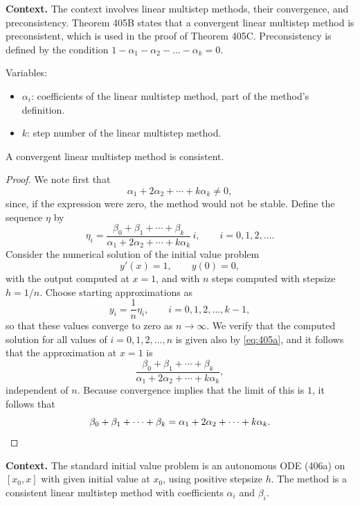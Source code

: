 \noindent\textbf{Context.}
The context involves linear multistep methods, their convergence, and preconsistency. Theorem 405B states that a convergent linear multistep method is preconsistent, which is used in the proof of Theorem 405C. Preconsistency is defined by the condition $1 - \alpha_1 - \alpha_2 - \dots - \alpha_k = 0$.

Variables:
\begin{itemize}
    \item $\alpha_i$: coefficients of the linear multistep method, part of the method's definition.
    \item $k$: step number of the linear multistep method.
\end{itemize}

\begin{theorem}

  \label{thm:405C}
A convergent linear multistep method is consistent.
\end{theorem}

\begin{proof}
We note first that
\[
\alpha_1 + 2\alpha_2 + \cdots + k\alpha_k \neq 0,
\]
since, if the expression were zero, the method would not be stable. Define the sequence $\eta$ by
\[
\eta_i = \frac{\beta_0 + \beta_1 + \cdots + \beta_k}{\alpha_1 + 2\alpha_2 + \cdots + k\alpha_k} \, i, \qquad i = 0, 1, 2, \dots .
\]
Consider the numerical solution of the initial value problem
\[
y'(x) = 1, \qquad y(0) = 0,
\]
with the output computed at $x = 1$, and with $n$ steps computed with stepsize $h = 1/n$. Choose starting approximations as
\[
y_i = \frac{1}{n} \eta_i, \qquad i = 0, 1, 2, \dots, k-1, \tag{405a}
\]
so that these values converge to zero as $n \to \infty$. We verify that the computed solution for all values of $i = 0, 1, 2, \dots, n$ is given also by \eqref{eq:405a}, and it follows that the approximation at $x = 1$ is
\[
\frac{\beta_0 + \beta_1 + \cdots + \beta_k}{\alpha_1 + 2\alpha_2 + \cdots + k\alpha_k},
\]
independent of $n$. Because convergence implies that the limit of this is $1$, it follows that
\[
\beta_0 + \beta_1 + \cdots + \beta_k = \alpha_1 + 2\alpha_2 + \cdots + k\alpha_k. \qedhere
\]
\end{proof}

\noindent\textbf{Context.}
The standard initial value problem is an autonomous ODE (406a) on $[x_0, x]$ with given initial value at $x_0$, using positive stepsize $h$. The method is a consistent linear multistep method with coefficients $\alpha_i$ and $\beta_i$.

